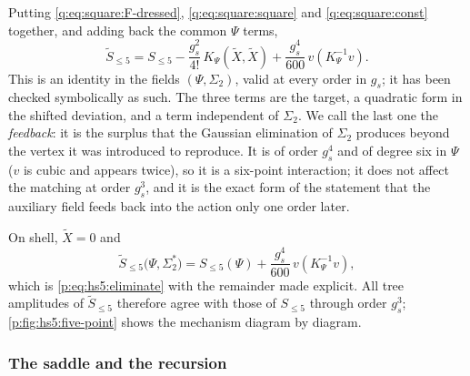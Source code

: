 Putting \eqref{q:eq:square:F-dressed}, \eqref{q:eq:square:square} and \eqref{q:eq:square:const} together, and adding back the common $\Psi$ terms,
\begin{equation}
  \label{q:eq:square:identity}
  \boxed{\;
  \widetilde S_{\le 5}
    = S_{\le 5}
      - \frac{g_s^2}{4!} \, K_\Psi(\tilde X, \tilde X)
      + \frac{g_s^4}{600} \, v(K_\Psi^{-1} v).
  \;}
\end{equation}
This is an identity in the fields $(\Psi,\Sigma_2)$, valid at every order in $g_s$; it has been checked symbolically as such.
The three terms are the target, a quadratic form in the shifted deviation, and a term independent of $\Sigma_2$.
We call the last one the \emph{feedback}: it is the surplus that the Gaussian elimination of $\Sigma_2$ produces beyond the vertex it was introduced to reproduce.
It is of order $g_s^4$ and of degree six in $\Psi$ ($v$ is cubic and appears twice), so it is a six-point interaction; it does not affect the matching at order $g_s^3$, and it is the exact form of the statement that the auxiliary field feeds back into the action only one order later.

On shell, $\tilde X=0$ and
\begin{equation}
  \label{q:eq:square:onshell}
  \widetilde S_{\le 5}\big(\Psi, \Sigma_2^*\big)
    = S_{\le 5}(\Psi) + \frac{g_s^4}{600} \, v(K_\Psi^{-1} v),
\end{equation}
which is \eqref{p:eq:hs5:eliminate} with the remainder made explicit.
All tree amplitudes of $\widetilde S_{\le5}$ therefore agree with those of $S_{\le5}$ through order $g_s^3$; \cref{p:fig:hs5:five-point} shows the mechanism diagram by diagram.

\subsubsection{The saddle and the recursion}
\label{q:sec:square:recursion}

